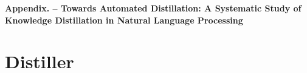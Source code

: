 \documentclass[11pt]{article}
\begin{document}
\newpage

\clearpage


\newpage
\appendix
\begin{center}
{\Large \textbf{Appendix. -- Towards Automated Distillation: A Systematic Study of Knowledge Distillation in Natural Language Processing}}    
\end{center}

\section{Distiller}
\label{sec:distiller}
\end{document}
